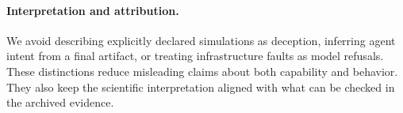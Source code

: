 \paragraph{Interpretation and attribution.}
We avoid describing explicitly declared simulations as deception, inferring
agent intent from a final artifact, or treating infrastructure faults as
model refusals. These distinctions reduce misleading claims about both
capability and behavior. They also keep the scientific interpretation
aligned with what can be checked in the archived evidence.
